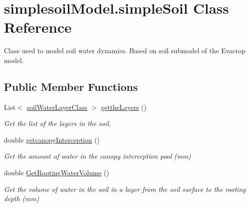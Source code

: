 \hypertarget{classsimplesoil_model_1_1simple_soil}{}\section{simplesoil\+Model.\+simple\+Soil Class Reference}
\label{classsimplesoil_model_1_1simple_soil}


Class used to model soil water dynamics. Based on soil submodel of the Evacrop model.  


\subsection*{Public Member Functions}
\begin{DoxyCompactItemize}
\item 
\mbox{\label{classsimplesoil_model_1_1simple_soil_a2bdef505d32a606cc6937983a77abed2}} 
List$<$ \mbox{\hyperlink{classsimplesoil_model_1_1soil_water_layer_class}{soil\+Water\+Layer\+Class}} $>$ \mbox{\hyperlink{classsimplesoil_model_1_1simple_soil_a2bdef505d32a606cc6937983a77abed2}{getthe\+Layers}} ()
\begin{DoxyCompactList}\small\item\em Get the list of the layers in the soil. \end{DoxyCompactList}\item 
\mbox{\label{classsimplesoil_model_1_1simple_soil_a8409280085e27eeab591070b94e39674}} 
double \mbox{\hyperlink{classsimplesoil_model_1_1simple_soil_a8409280085e27eeab591070b94e39674}{getcanopy\+Interception}} ()
\begin{DoxyCompactList}\small\item\em Get the amount of water in the canopy interception pool (mm) \end{DoxyCompactList}\item 
\mbox{\label{classsimplesoil_model_1_1simple_soil_a9784cacbb68950312021f3ff082c0fa5}} 
double \mbox{\hyperlink{classsimplesoil_model_1_1simple_soil_a9784cacbb68950312021f3ff082c0fa5}{Get\+Rooting\+Water\+Volume}} ()
\begin{DoxyCompactList}\small\item\em Get the volume of water in the soil in a layer from the soil surface to the rooting depth (mm) \end{DoxyCompactList}\item 

\end{DoxyCompactItemize}
